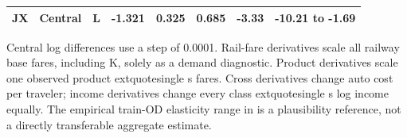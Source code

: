 \begin{table}[htbp]
\begin{minipage}{.95\textwidth}
\begin{tabular*}{\linewidth}{@{\extracolsep{\fill}}lllrrrrl@{}}
JX & Central & L & -1.321 & 0.325 & 0.685 & -3.33 & -10.21 to -1.69 \\
\bottomrule\end{tabular*}\par\medskip
\par\noindent\fontsize{8}{9.5}\selectfont Central log differences use a step of 0.0001. Rail-fare derivatives scale all railway base fares, including K, solely as a demand diagnostic. Product derivatives scale one observed product	extquotesingle s fares. Cross derivatives change auto cost per traveler; income derivatives change every class	extquotesingle s log income equally. The empirical train-OD elasticity range in \citet{ZhengFare2017} is a plausibility reference, not a directly transferable aggregate estimate.
\end{minipage}\end{table}
